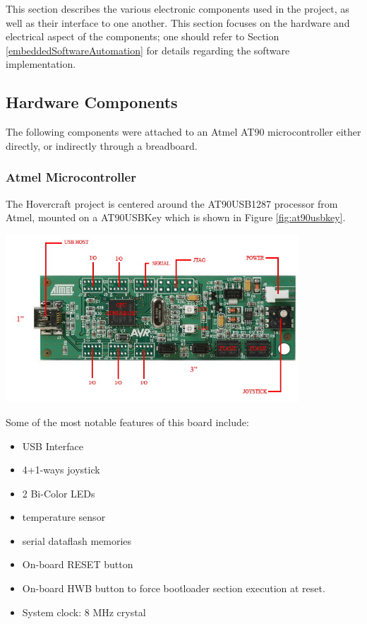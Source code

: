 This section describes the various electronic components used in the project, as
well as their interface to one another.  This section focuses on the hardware
and electrical aspect of the components; one should refer to Section
\ref{embeddedSoftwareAutomation} for details regarding the software
implementation.  

\subsection{Hardware Components}
The following components were attached to an Atmel AT90 microcontroller either directly, or indirectly through a breadboard.  

\subsubsection{Atmel Microcontroller}
The Hovercraft project is centered around the AT90USB1287 processor from Atmel, mounted on a AT90USBKey which is shown in Figure \ref{fig:at90usbkey}.

\begin{minipage}{6.5in}
  \centering
    \includegraphics[width=110mm]{imageSources/at90usbkey.png}
  
  \label{fig:at90usbkey}
\end{minipage}
\vspace{0.1in}

Some of the most notable features of this board include:
\begin{itemize}
\item USB Interface
\item 4+1-ways joystick
\item 2 Bi-Color LEDs
\item temperature sensor
\item serial dataflash memories
\item On-board RESET button 
\item On-board HWB button to force bootloader section execution at reset.
\item System clock: 8 MHz crystal
\end{itemize}

